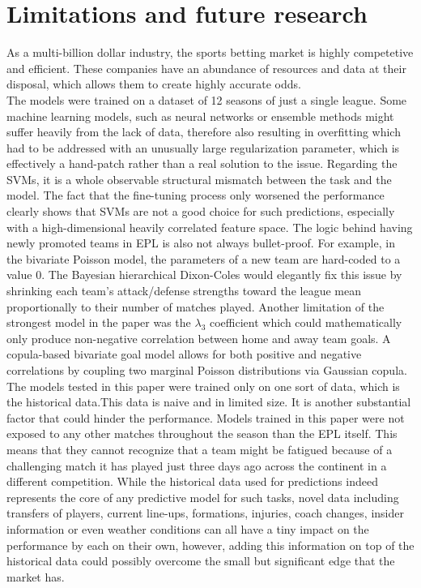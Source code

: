 \documentclass{article}
\begin{document}
\section{Limitations and future research}
As a multi-billion dollar industry, the sports betting market is highly competetive and efficient. These companies have an abundance of resources and data at their disposal, which allows them to create highly accurate odds. 
\\
The models were trained on a dataset of 12 seasons of just a single league. Some machine learning models, such as neural networks or ensemble methods might suffer heavily from the lack of data, therefore also resulting in overfitting which had to be addressed with an unusually large regularization parameter, which is effectively a hand-patch rather than a real solution to the issue. Regarding the SVMs, it is a whole observable structural mismatch between the task and the model. The fact that the fine-tuning process only worsened the performance clearly shows that SVMs are not a good choice for such predictions, especially with a high-dimensional heavily correlated feature space. The logic behind having newly promoted teams in EPL is also not always bullet-proof. For example, in the bivariate Poisson model, the parameters of a new team are hard-coded to a value 0. The Bayesian hierarchical Dixon-Coles \cite{BaioBlangiardo2010BayesianDixonColes}would elegantly fix this issue by shrinking each team's attack/defense strengths toward the league mean proportionally to their number of matches played. Another limitation of the strongest model in the paper was the $\lambda_3$ coefficient which could mathematically only produce non-negative correlation between home and away team goals. A copula-based bivariate goal model \cite{McHaleScarf2011Copula} allows for both positive and negative correlations by coupling two marginal Poisson distributions via Gaussian copula. 
\\
The models tested in this paper were trained only on one sort of data, which is the historical data.This data is naive and in limited size. It is another substantial factor that could hinder the performance. Models trained in this paper were not exposed to any other matches throughout the season than the EPL itself. This means that they cannot recognize that a team might be fatigued because of a challenging match it has played just three days ago across the continent in a different competition. While the historical data used for predictions indeed represents the core of any predictive model for such tasks, novel data including transfers of players, current line-ups, formations, injuries, coach changes, insider information or even weather conditions can all have a tiny impact on the performance by each on their own, however, adding this information on top of the historical data could possibly overcome the small but significant edge that the market has. 
\end{document}
